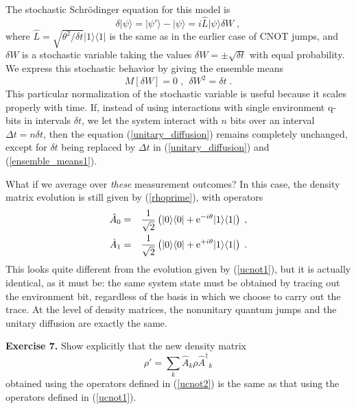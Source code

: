 \documentclass[12pt]{article}
\def\bra#1{{\langle #1 |}}
\def\ket#1{{| #1 \rangle}}
\def\e{{\rm e}}
\def\A{{\hat A}}
\def\Adag{{\hat A^\dagger}}
\def\L{{\hat L}}
\begin{document}
The stochastic Schr\"odinger equation for this model is
\begin{equation}
\delta\ket\psi = \ket{\psi'} - \ket\psi = i \L \ket\psi \delta W \;,
\label{unitary_diffusion}
\end{equation}
where $\L=\sqrt{\theta^2/\delta t}\ket1\bra1$ is the same as in the
earlier case of CNOT jumps, and $\delta W$ is a stochastic variable taking
the values $\delta W = \pm \sqrt{\delta t}$ with equal probability.
We express this stochastic behavior by giving the ensemble means
\begin{equation}
M[\delta W] = 0 \;, \ \ \delta W^2 = \delta t \;.
\label{ensemble_means1}
\end{equation}
This particular normalization of the stochastic variable is useful
because it scales properly with time.  If, instead of using interactions
with single environment q-bits in intervals $\delta t$, we let
the system interact with $n$ bits over an interval $\Delta t = n\delta t$,
then the equation (\ref{unitary_diffusion}) remains completely
unchanged, except for $\delta t$ being replaced by $\Delta t$ in
(\ref{unitary_diffusion}) and (\ref{ensemble_means1}).

What if we average over {\it these} measurement outcomes?  In this case,
the density matrix evolution is still given by (\ref{rhoprime}),
with operators
\begin{eqnarray}
\A_0 &=& {1\over\sqrt2}\left(\ket0\bra0
  + \e^{-i\theta}\ket1\bra1 \right) \;, \nonumber\\
\A_1 &=& {1\over\sqrt2}\left(\ket0\bra0
  + \e^{+i\theta}\ket1\bra1 \right) \;.
\label{ucnot2}
\end{eqnarray}
This looks quite different from the evolution given by (\ref{ucnot1}),
but it is actually identical, as it must be:  the same system state must
be obtained by tracing out the environment bit, regardless of the basis
in which we choose to carry out the trace.
At the level of density matrices, the nonunitary quantum jumps and the
unitary diffusion are exactly the same.

\medskip\noindent
{\bf Exercise 7.}  Show explicitly that the new density matrix
\begin{equation}
\rho' = \sum_k \A_k \rho \Adag_k
\end{equation}
obtained using the operators defined in (\ref{ucnot2}) is the same as
that using the operators defined in (\ref{ucnot1}).
\medskip
\end{document}

